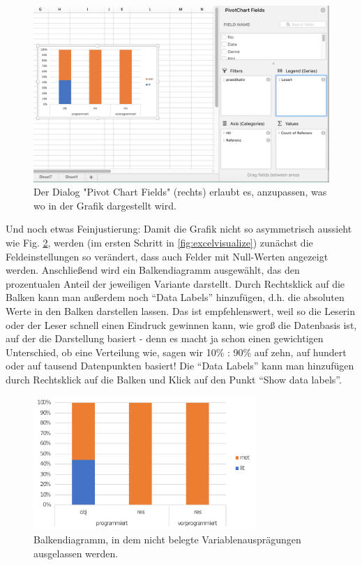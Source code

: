 \documentclass[]{article}
\begin{document}
\begin{figure}
\includegraphics[width=4.49in]{docs/fig/excel_pivotchartfields} \caption{Der Dialog "Pivot Chart Fields" (rechts) erlaubt es, anzupassen, was wo in der Grafik dargestellt wird.}\label{fig:pivotchartfields}
\end{figure}

Und noch etwas Feinjustierung: Damit die Grafik nicht so asymmetrisch
aussieht wie Fig. \ref{fig:asymmetric}, werden (im ersten Schritt in
\ref{fig:excelvisualize}) zunächst die Feldeinstellungen so verändert,
dass auch Felder mit Null-Werten angezeigt werden. Anschließend wird ein
Balkendiagramm ausgewählt, das den prozentualen Anteil der jeweiligen
Variante darstellt. Durch Rechtsklick auf die Balken kann man außerdem
noch ``Data Labels'' hinzufügen, d.h. die absoluten Werte in den Balken
darstellen lassen. Das ist empfehlenswert, weil so die Leserin oder der
Leser schnell einen Eindruck gewinnen kann, wie groß die Datenbasis ist,
auf der die Darstellung basiert - denn es macht ja schon einen
gewichtigen Unterschied, ob eine Verteilung wie, sagen wir 10\% : 90\%
auf zehn, auf hundert oder auf tausend Datenpunkten basiert! Die ``Data
Labels'' kann man hinzufügen durch Rechtsklick auf die Balken und Klick
auf den Punkt ``Show data labels''.

\begin{figure}
\includegraphics[width=3.32in]{docs/fig/excel_asymmetric} \caption{Balkendiagramm, in dem nicht belegte Variablenausprägungen ausgelassen werden.}\label{fig:asymmetric}
\end{figure}
\end{document}
